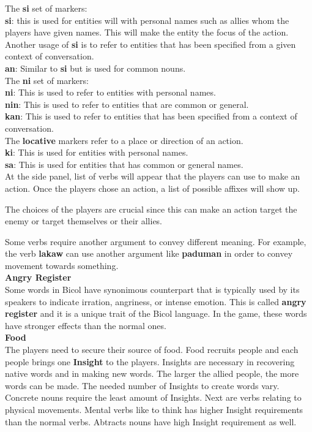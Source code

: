\documentclass[11pt]{article}
\begin{document}
The \textbf{si} set of markers:\\
\textbf{si}: this is used for entities will with personal names such as allies whom the players have given names. This will make the entity the focus of the action. Another usage of \textbf{si} is to refer to entities that has been specified from a given context of conversation. \\
\textbf{an}: Similar to \textbf{si} but is used for common nouns.\\

The \textbf{ni} set of markers:\\
\textbf{ni}: This is used to refer to entities with personal names.\\
\textbf{nin}: This is used to refer to entities that are common or general.\\
\textbf{kan}: This is used to refer to entities that has been specified from a context of conversation.\\

The \textbf{locative} markers refer to a place or direction of an action.\\
\textbf{ki}: This is used for entities with personal names.\\
\textbf{sa}: This is used for entities that has common or general names.\\

At the side panel, list of verbs will appear that the players can use to make an action. Once the players chose an action, a list of possible affixes will show up.

The choices of the players are crucial since this can make an action target the enemy or target themselves or their allies.

Some verbs require another argument to convey different meaning. For example, the verb \textbf{lakaw} can use another argument like \textbf{paduman} in order to convey movement towards something.\\

\textbf{Angry Register}\\
Some words in Bicol have synonimous counterpart that is typically used by its speakers to indicate irration, angriness, or intense emotion. This is called \textbf{angry register} and it is a unique trait of the Bicol language. In the game, these words have stronger effects than the normal ones.\\

\textbf{Food}\\
The players need to secure their source of food. Food recruits people and each people brings one \textbf{Insight} to the players. Insights are necessary in recovering native words and in making new words. The larger the allied people, the more words can be made. The needed number of Insights to create words vary.
Concrete nouns require the least amount of Insights. Next are verbs relating to physical movements. Mental verbs like to think has higher Insight requirements than the normal verbs. Abtracts nouns have high Insight requirement as well.\\
\end{document}
